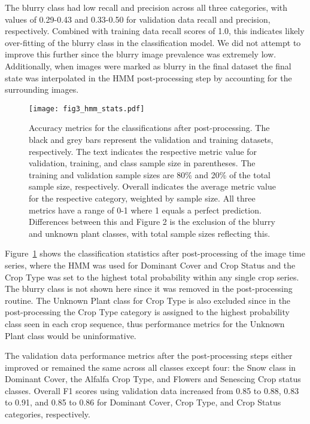\documentclass[remotesensing,article,submit,moreauthors,pdftex]{Definitions/mdpi}
\begin{document}
The blurry class had low recall and precision across all three categories, with values of 0.29-0.43 and 0.33-0.50 for validation data recall and precision, respectively. Combined with training data recall scores of 1.0, this indicates likely over-fitting of the blurry class in the classification model. We did not attempt to improve this further since the blurry image prevalence was extremely low. Additionally, when images were marked as blurry in the final dataset the final state was interpolated in the HMM post-processing step by accounting for the surrounding images.

\begin{figure}[H]
    \centering
    \texttt{[image: fig3\_hmm\_stats.pdf]}
    \caption{Accuracy metrics for the classifications after post-processing. The black and grey bars represent the validation and training datasets, respectively. The text indicates the respective metric value for validation, training, and class sample size in parentheses. The training and validation sample sizes are 80\% and 20\% of the total sample size, respectively. Overall indicates the average metric value for the respective category, weighted by sample size. All three metrics have a range of 0-1 where 1 equals a perfect prediction. Differences between this and Figure 2 is the exclusion of the blurry and unknown plant classes, with total sample sizes reflecting this.}
    \label{fig3}
\end{figure}

Figure~\ref{fig3} shows the classification statistics after post-processing of the image time series, where the HMM was used for Dominant Cover and Crop Status and the Crop Type was set to the highest total probability within any single crop series. The blurry class is not shown here since it was removed in the post-processing routine. The Unknown Plant class for Crop Type is also excluded since in the post-processing the Crop Type category is assigned to the highest probability class seen in each crop sequence, thus performance metrics for the Unknown Plant class would be uninformative. 

The validation data performance metrics after the post-processing steps either improved or remained the same across all classes except four: the Snow class in Dominant Cover, the Alfalfa Crop Type, and Flowers and Senescing Crop status classes. Overall F1 scores using validation data increased from 0.85 to 0.88, 0.83 to 0.91, and 0.85 to 0.86 for Dominant Cover, Crop Type, and Crop Status categories, respectively. 
\end{document}
